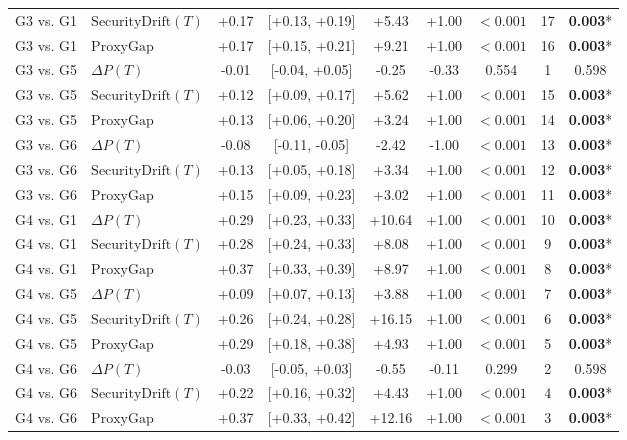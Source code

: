 \begin{table}[t]
\begin{tabular}{llccccccc}
G3 vs. G1 & $\text{SecurityDrift}(T)$ & +0.17 & [+0.13, +0.19] & +5.43 & +1.00 & $<0.001$ & 17 & \textbf{0.003}* \\
G3 vs. G1 & $\text{ProxyGap}$ & +0.17 & [+0.15, +0.21] & +9.21 & +1.00 & $<0.001$ & 16 & \textbf{0.003}* \\
G3 vs. G5 & $\Delta P(T)$ & -0.01 & [-0.04, +0.05] & -0.25 & -0.33 & 0.554 & 1 & 0.598 \\
G3 vs. G5 & $\text{SecurityDrift}(T)$ & +0.12 & [+0.09, +0.17] & +5.62 & +1.00 & $<0.001$ & 15 & \textbf{0.003}* \\
G3 vs. G5 & $\text{ProxyGap}$ & +0.13 & [+0.06, +0.20] & +3.24 & +1.00 & $<0.001$ & 14 & \textbf{0.003}* \\
G3 vs. G6 & $\Delta P(T)$ & -0.08 & [-0.11, -0.05] & -2.42 & -1.00 & $<0.001$ & 13 & \textbf{0.003}* \\
G3 vs. G6 & $\text{SecurityDrift}(T)$ & +0.13 & [+0.05, +0.18] & +3.34 & +1.00 & $<0.001$ & 12 & \textbf{0.003}* \\
G3 vs. G6 & $\text{ProxyGap}$ & +0.15 & [+0.09, +0.23] & +3.02 & +1.00 & $<0.001$ & 11 & \textbf{0.003}* \\
G4 vs. G1 & $\Delta P(T)$ & +0.29 & [+0.23, +0.33] & +10.64 & +1.00 & $<0.001$ & 10 & \textbf{0.003}* \\
G4 vs. G1 & $\text{SecurityDrift}(T)$ & +0.28 & [+0.24, +0.33] & +8.08 & +1.00 & $<0.001$ & 9 & \textbf{0.003}* \\
G4 vs. G1 & $\text{ProxyGap}$ & +0.37 & [+0.33, +0.39] & +8.97 & +1.00 & $<0.001$ & 8 & \textbf{0.003}* \\
G4 vs. G5 & $\Delta P(T)$ & +0.09 & [+0.07, +0.13] & +3.88 & +1.00 & $<0.001$ & 7 & \textbf{0.003}* \\
G4 vs. G5 & $\text{SecurityDrift}(T)$ & +0.26 & [+0.24, +0.28] & +16.15 & +1.00 & $<0.001$ & 6 & \textbf{0.003}* \\
G4 vs. G5 & $\text{ProxyGap}$ & +0.29 & [+0.18, +0.38] & +4.93 & +1.00 & $<0.001$ & 5 & \textbf{0.003}* \\
G4 vs. G6 & $\Delta P(T)$ & -0.03 & [-0.05, +0.03] & -0.55 & -0.11 & 0.299 & 2 & 0.598 \\
G4 vs. G6 & $\text{SecurityDrift}(T)$ & +0.22 & [+0.16, +0.32] & +4.43 & +1.00 & $<0.001$ & 4 & \textbf{0.003}* \\
G4 vs. G6 & $\text{ProxyGap}$ & +0.37 & [+0.33, +0.42] & +12.16 & +1.00 & $<0.001$ & 3 & \textbf{0.003}* \\
\bottomrule
\end{tabular}
\end{table}
